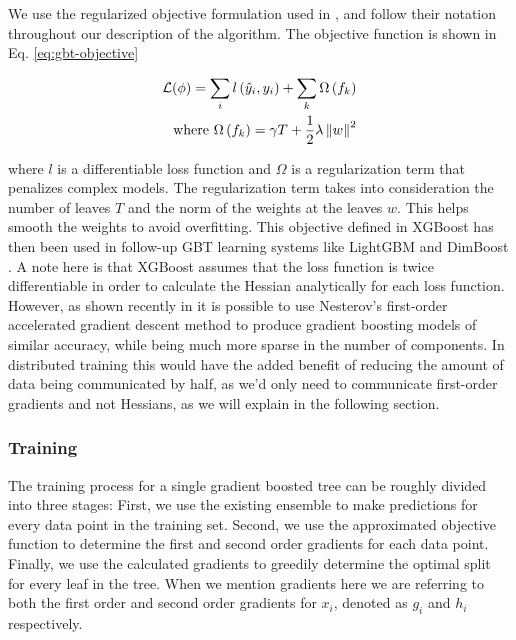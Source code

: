 
We use the
regularized objective formulation used
in \cite{xgboost}, and follow their notation throughout our description of the algorithm.
The objective function is shown in Eq. \ref{eq:gbt-objective}

\begin{equation}
	\begin{split}
	\mathcal{L}(\phi) = \sum_{i} l\left(\hat{y}_{i},y_{i}\right) + \sum_{k} \Omega\left(f_{k}\right) \\
	\text{where } \Omega\left(f_{k}\right) = \gamma T + \frac{1}{2} \lambda \left\lVert w\right\rVert^2
	\end{split}
	\label{eq:gbt-objective}
\end{equation}

\noindent
where $l$ is a differentiable loss function and $\Omega$ is a regularization term
that penalizes complex models. The regularization term takes into consideration
the number of leaves $T$ and the norm of the weights at the leaves $w$. This helps
smooth the weights to avoid overfitting. This objective defined in XGBoost
has then been used in follow-up GBT learning systems like LightGBM and 
DimBoost \cite{lightgbm, dimboost}.  A note here is that XGBoost
assumes that the loss function is twice differentiable in order
to calculate the Hessian analytically for each loss function.
However, as shown recently in \cite{accelerated-gb} it is possible
to use Nesterov's first-order accelerated gradient descent method
\cite{nesterov-book} to produce gradient boosting models of similar
accuracy, while being much more sparse in the number of components.
In distributed training this would have the added benefit of reducing
the amount of data being communicated by half, as we'd only need to
communicate first-order gradients and not Hessians, as we will explain
in the following section.



\subsubsection*{Training}

The training process for a single gradient boosted tree can be roughly divided into three stages:
First, we use the existing ensemble to make predictions for every data point in the training
set. Second, we use the approximated objective function to determine the first and second order
gradients for each data point. Finally, we use the calculated gradients to greedily determine
the optimal split for every leaf in the tree. When we mention gradients here we are referring
to both the first order and second order gradients for $x_i$, denoted as $g_i$ and $h_i$
respectively.

